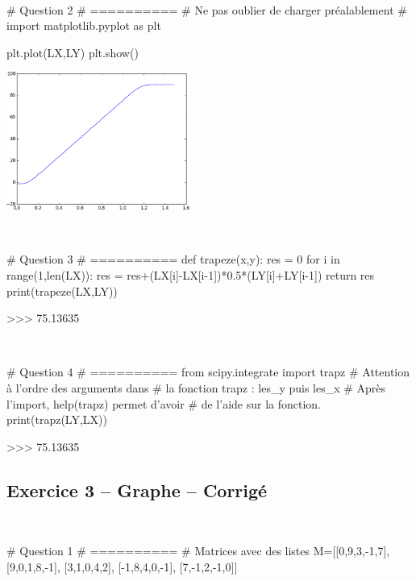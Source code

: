 \documentclass[10pt,fleqn]{article} %
\begin{document}
\begin{corrige}
$\quad$
\begin{python}
# Question 2
# ==========
# Ne pas oublier de charger préalablement 
# import matplotlib.pyplot as plt

plt.plot(LX,LY)
plt.show()
\end{python}
\end{corrige}
\begin{center}
\includegraphics[width=6cm] {images/exo_02}
\end{center}


\begin{corrige}
$\quad$
\begin{python}
# Question 3
# ==========
def trapeze(x,y):
    res = 0 
    for i in range(1,len(LX)):
        res = res+(LX[i]-LX[i-1])*0.5*(LY[i]+LY[i-1])
    return res
print(trapeze(LX,LY))

>>> 75.13635
\end{python}
\end{corrige}

\begin{corrige}
$\quad$
\begin{python}
# Question 4
# ==========
from scipy.integrate import trapz
# Attention à l'ordre des arguments dans 
# la fonction trapz : les_y puis les_x
# Après l'import, help(trapz) permet d'avoir 
# de l'aide sur la fonction.
print(trapz(LY,LX))

>>> 75.13635
\end{python}
\end{corrige}

\subsection*{Exercice 3 -- Graphe -- Corrigé}

\begin{corrige}
$\quad$
\begin{python}
# Question 1
# ==========
# Matrices avec des listes
M=[[0,9,3,-1,7],
      [9,0,1,8,-1],
      [3,1,0,4,2],
      [-1,8,4,0,-1],
      [7,-1,2,-1,0]]
\end{python}
\end{corrige}
\end{document}
